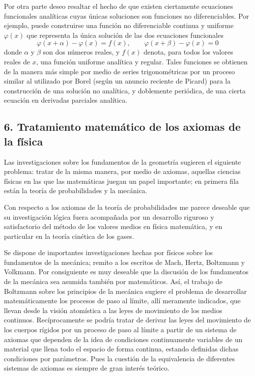 \documentclass[a4paper, 12pt]{article}
\begin{document}
Por otra parte deseo resaltar el hecho de que existen ciertamente ecuaciones funcionales analíticas cuyas únicas soluciones son funciones no diferenciables. Por ejemplo, puede construirse una función no diferenciable continua y uniforme $\varphi(x)$   que representa la única solución de las dos ecuaciones funcionales 
$$
\varphi(x+\alpha)- \varphi(x)=f(x), \qquad \varphi(x+\beta)- \varphi(x)=0
$$ 
 donde $\alpha$ y $\beta$ son dos números reales, y $f( x)$  denota, para todos los valores reales de $x$, una función  uniforme  analítica y regular. Tales funciones se obtienen de la manera más simple por medio de series trigonométricas por un proceso similar al utilizado por Borel (según un anuncio reciente de Picard) para la construcción de una solución no analítica, y doblemente periódica, de una cierta ecuación en derivadas parciales analítica. 
   
   
\subsection*{6. Tratamiento matemático de los axiomas de la física}


Las investigaciones sobre los fundamentos de la geometría sugieren el siguiente problema: tratar de la misma manera, por medio de axiomas, aquellas ciencias físicas en las que las matemáticas juegan un papel importante; en primera fila están la teoría de probabilidades y la mecánica. 

Con respecto a los axiomas de la teoría de probabilidades me parece deseable que su investigación lógica fuera acompañada por un desarrollo riguroso y satisfactorio del método de los valores medios en física matemática, y en particular en la teoría cinética de los gases. 

Se dispone de importantes investigaciones hechas por físicos sobre los fundamentos de la mecánica; remito a los escritos de Mach, Hertz, Boltzmann y Volkmann. Por consiguiente es muy deseable que la discusión de los fundamentos de la mecánica sea asumida también por matemáticos. Así, el trabajo de Boltzmann sobre los principios de la mecánica sugiere el problema de desarrollar matemáticamente los procesos de paso al límite, allí meramente indicados, que llevan desde la visión atomística a las leyes de movimiento de los medios continuos. Recíprocamente se podría tratar de derivar las leyes del movimiento de los cuerpos rígidos por un proceso de paso al límite a partir de un sistema de axiomas que dependen de la idea de condiciones continuamente variables de un  material que llena todo el espacio de forma continua, estando definidas  dichas condiciones por parámetros. Pues la cuestión de la equivalencia  de diferentes sistemas de axiomas es siempre de gran interés teórico. 
\end{document}
